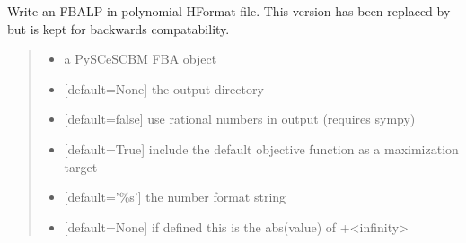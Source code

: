 \documentclass[letterpaper,12pt,english]{sphinxmanual}
\begin{document}
\begin{fulllineitems}

\pysigstartsignatures
\pysiglinewithargsret
{}
{\sphinxparamcomma {}\sphinxparamcomma {}\sphinxparamcomma {}\sphinxparamcomma {}\sphinxparamcomma {}}
{}
\pysigstopsignatures
\sphinxAtStartPar
Write an FBA\sphinxhyphen{}LP in polynomial H\sphinxhyphen{}Format file. This version has been replaced by  but is kept for backwards compatability.
\begin{quote}\begin{description}
\begin{itemize}
\item {} 
\sphinxAtStartPar
{} \textendash{} a PySCeS\sphinxhyphen{}CBM FBA object

\item {} 
\sphinxAtStartPar
{} \textendash{} {[}default=None{]} the output directory

\item {} 
\sphinxAtStartPar
{} \textendash{} {[}default=false{]} use rational numbers in output (requires sympy)

\item {} 
\sphinxAtStartPar
{} \textendash{} {[}default=True{]} include the default objective function as a maximization target

\item {} 
\sphinxAtStartPar
{} \textendash{} {[}default=’\%s’{]} the number format string

\item {} 
\sphinxAtStartPar
{} \textendash{} {[}default=None{]} if defined this is the abs(value) of +\sphinxhyphen{}\textless{}infinity\textgreater{}

\end{itemize}

\end{description}\end{quote}

\end{fulllineitems}
\end{document}

